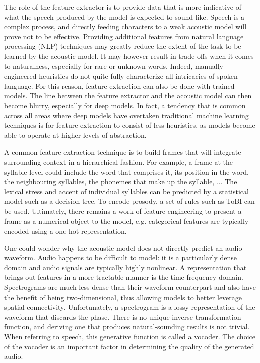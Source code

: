 \documentclass[a4paper, oneside, 12pt, english]{article}
\begin{document}
The role of the feature extractor is to provide data that is more indicative of what the speech produced by the model is expected to sound like. Speech is a complex process, and directly feeding characters to a weak acoustic model will prove not to be effective. Providing additional features from natural language processing (NLP) techniques may greatly reduce the extent of the task to be learned by the acoustic model. It may however result in trade-offs when it comes to naturalness, especially for rare or unknown words. Indeed, manually engineered heuristics do not quite fully characterize all intricacies of spoken language. For this reason, feature extraction can also be done with trained models. The line between the feature extractor and the acoustic model can then become blurry, especially for deep models. In fact, a tendency that is common across all areas where deep models have overtaken traditional machine learning techniques is for feature extraction to consist of less heuristics, as models become able to operate at higher levels of abstraction.

A common feature extraction technique is to build frames that will integrate surrounding context in a hierarchical fashion. For example, a frame at the syllable level could include the word that comprises it, its position in the word, the neighbouring syllables, the phonemes that make up the syllable, ... The lexical stress and accent of individual syllables can be predicted by a statistical model such as a decision tree. To encode prosody, a set of rules such as ToBI \citep{TOBI} can be used. Ultimately, there remains a work of feature engineering to present a frame as a numerical object to the model, e.g. categorical features are typically encoded using a one-hot representation.

One could wonder why the acoustic model does not directly predict an audio waveform. Audio happens to be difficult to model: it is a particularly dense domain and audio signals are typically highly nonlinear. A representation that brings out features in a more tractable manner is the time-frequency domain. Spectrograms are much less dense than their waveform counterpart and also have the benefit of being two-dimensional, thus allowing models to better leverage spatial connectivity. Unfortunately, a spectrogram is a lossy representation of the waveform that discards the phase. There is no unique inverse transformation function, and deriving one that produces natural-sounding results is not trivial. When referring to speech, this generative function is called a vocoder. The choice of the vocoder is an important factor in determining the quality of the generated audio.
\end{document}
